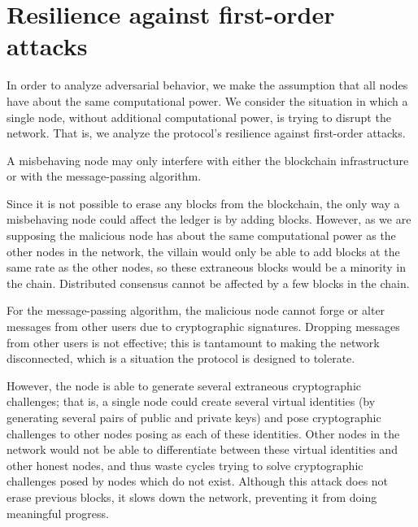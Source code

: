 \section{Resilience against first-order attacks}
\label{sec:first-order-attacks}

In order to analyze adversarial behavior,
we make the assumption that all nodes have about the same computational power.
We consider the situation in which a single node,
without additional computational power,
is trying to disrupt the network.
That is,
we analyze the protocol's resilience against first-order attacks.

A misbehaving node may only interfere with either the blockchain infrastructure
or with the message-passing algorithm.

Since it is not possible to erase any blocks from the blockchain,
the only way a misbehaving node could affect the ledger
is by adding blocks.
However,
as we are supposing the malicious node
has about the same computational power as the other nodes in the network,
the villain would only be able to add blocks at the same rate as the other nodes,
so these extraneous blocks would be a minority in the chain.
Distributed consensus cannot be affected by a few blocks in the chain.

For the message-passing algorithm,
the malicious node cannot forge or alter messages from other users
due to cryptographic signatures.
Dropping messages from other users is not effective;
this is tantamount to making the network disconnected,
which is a situation the protocol is designed to tolerate.

However,
the node is able to generate several extraneous cryptographic challenges;
that is,
a single node could create several virtual identities
(by generating several pairs of public and private keys)
and pose cryptographic challenges to other nodes posing as each of these identities.
Other nodes in the network would not be able to differentiate between
these virtual identities and other honest nodes,
and thus waste cycles trying to solve cryptographic challenges
posed by nodes which do not exist.
Although this attack does not erase previous blocks,
it slows down the network,
preventing it from doing meaningful progress.
